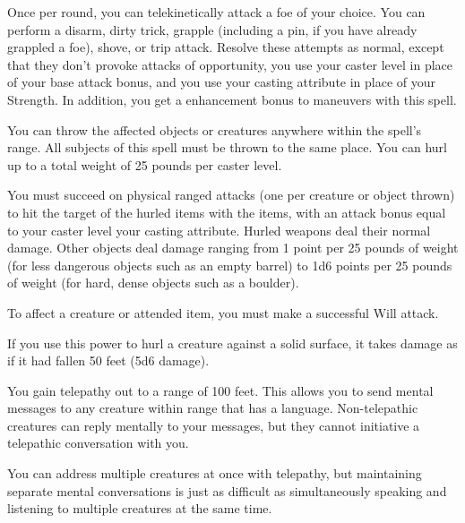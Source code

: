 \spelleffect Once per round, you can telekinetically attack a foe of your choice. You can perform a disarm, dirty trick, grapple (including a pin, if you have already grappled a foe), shove, or trip attack. Resolve these attempts as normal, except that they don't provoke attacks of opportunity, you use your caster level in place of your base attack bonus, and you use your casting attribute in place of your Strength. In addition, you get a  enhancement bonus to maneuvers with this spell. \spellbonusscalingdescription
{}

\spelleffect You can throw the affected objects or creatures anywhere within the spell's range. All subjects of this spell must be thrown to the same place. You can hurl up to a total weight of 25 pounds per caster level.
\par You must succeed on physical ranged attacks (one per creature or object thrown) to hit the target of the hurled items with the items, with an attack bonus equal to your caster level \add your casting attribute. Hurled weapons deal their normal damage. Other objects deal damage ranging from 1 point per 25 pounds of weight (for less dangerous objects such as an empty barrel) to 1d6 points per 25 pounds of weight (for hard, dense objects such as a boulder).
\par To affect a creature or attended item, you must make a successful Will attack.
\par If you use this power to hurl a creature against a solid surface, it takes damage as if it had fallen 50 feet (5d6 damage).

\spelldur{\durlong}
\spelleffect You gain telepathy out to a range of 100 feet. This allows you to send mental messages to any creature within range that has a language. Non-telepathic creatures can reply mentally to your messages, but they cannot initiative a telepathic conversation with you.

You can address multiple creatures at once with telepathy, but maintaining separate mental conversations is just as difficult as simultaneously speaking and listening to multiple creatures at the same time. 

